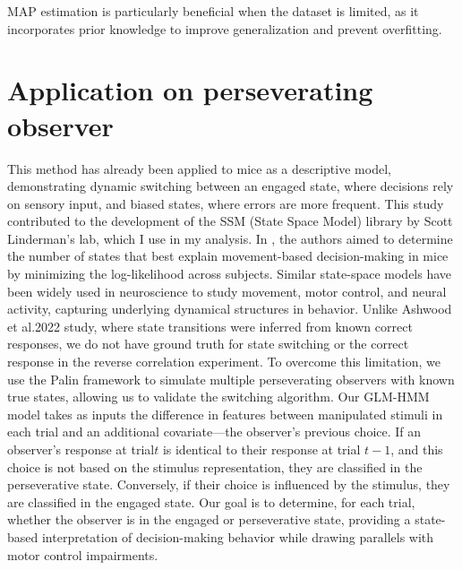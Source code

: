 MAP estimation is particularly beneficial when the dataset is limited, as it incorporates prior knowledge to improve generalization and prevent overfitting.

\section {Application on perseverating observer} 
This method has already been applied to mice as a descriptive model, demonstrating dynamic switching between an engaged state, where decisions rely on sensory input, and biased states, where errors are more frequent. This study contributed to the development of the SSM (State Space Model) library by Scott Linderman's lab, which I use in my analysis. In \cite{ashwood_mice_2022}, the authors aimed to determine the number of states that best explain movement-based decision-making in mice by minimizing the log-likelihood across subjects. Similar state-space models have been widely used in neuroscience to study movement, motor control, and neural activity, capturing underlying dynamical structures in behavior. Unlike Ashwood et al.2022 study, where state transitions were inferred from known correct responses, we do not have ground truth for state switching or the correct response in the reverse correlation experiment. To overcome this limitation, we use the Palin framework to simulate multiple perseverating observers with known true states, allowing us to validate the switching algorithm.
Our GLM-HMM model takes as inputs the difference in features between manipulated stimuli in each trial and an additional covariate—the observer's previous choice. If an observer’s response at trial\( t \) is identical to their response at trial \( t-1 \), and this choice is not based on the stimulus representation, they are classified in the perseverative state. Conversely, if their choice is influenced by the stimulus, they are classified in the engaged state. Our goal is to determine, for each trial, whether the observer is in the engaged or perseverative state, providing a state-based interpretation of decision-making behavior while drawing parallels with motor control impairments.
